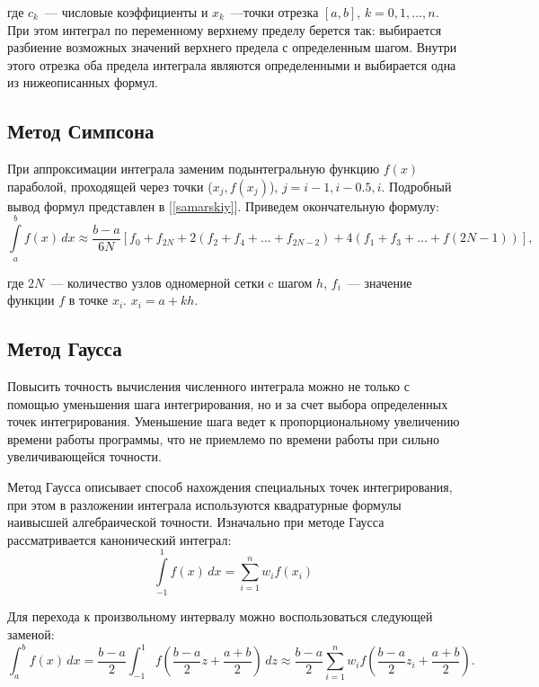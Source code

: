 где $c_k$~--- числовые коэффициенты и $x_k$~---точки отрезка $[a,b]$, $k=0, 1, \ldots, n$.
При этом интеграл по переменному верхнему пределу берется так: выбирается разбиение возможных значений верхнего предела
с определенным шагом. Внутри этого отрезка оба предела интеграла являются определенными и выбирается одна из  нижеописанных формул.

\subsection{Метод Симпсона\label{simpson}}
При аппроксимации интеграла заменим подынтегральную функцию $f(x)$ параболой, проходящей через точки
($x_j, f(x_j) $), $j=i-1, i-0.5, i$. Подробный вывод формул представлен в [\ref{samarskiy}]. Приведем окончательную формулу:
\begin{equation}
\int\limits^b_a f(x)\,dx \approx \dfrac{b-a}{6N}\left[f_0 +f_{2N}+2(f_2+f_4+\ldots+f_{2N-2})+4(f_1+f_3+\ldots+f(2N-1))\right],
\end{equation}

где $2N$~--- количество узлов одномерной сетки c шагом $h$, $f_i$~--- значение функции $f$ в точке $x_i$. $x_i = a+kh$.

\subsection{Метод Гаусса\label{gauss}}
Повысить точность вычисления численного интеграла можно не только с помощью уменьшения шага интегрирования, но и за счет 
выбора определенных точек интегрирования. Уменьшение шага ведет к пропорциональному увеличению времени работы программы, что не
приемлемо по времени работы при сильно увеличивающейся точности.

Метод Гаусса описывает способ нахождения специальных точек интегрирования, при этом в разложении интеграла используются квадратурные
формулы наивысшей алгебраической точности.
Изначально при методе Гаусса рассматривается канонический интеграл:
\begin{equation}
\int\limits_{-1}^1 f(x)\, dx = \sum\limits_{i=1}^n w_i f(x_i)
\end{equation}

Для перехода к произвольному интервалу можно воспользоваться следующей заменой:
\begin{equation}
\int_a^b f(x)\,dx = \frac{b-a}{2} \int_{-1}^1 f\left(\frac{b-a}{2}z 
+ \frac{a+b}{2}\right)\,dz \approx \frac{b-a}{2} \sum_{i=1}^n w_i f\left(\frac{b-a}{2}z_i + \frac{a+b}{2}\right).
\end{equation}

